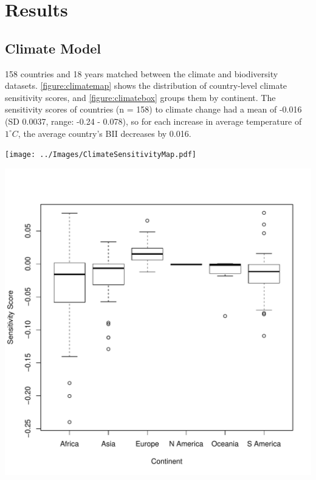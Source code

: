 \documentclass[11pt, a4paper, titlepage]{article}
\begin{document}
	\clearpage

	\section*{Results}
	\subsection*{Climate Model}
	
	158 countries and 18 years matched between the climate and biodiversity datasets. \autoref{figure:climatemap} shows the distribution of country-level climate sensitivity scores, and \autoref{figure:climatebox} groups them by continent. The sensitivity scores of countries (n = 158) to climate change had a mean of -0.016 (SD 0.0037, range: -0.24 - 0.078), so for each increase in average temperature of $1^\circ C$, the average country's BII decreases by 0.016.

	\begin{center}
		\texttt{[image: ../Images/ClimateSensitivityMap.pdf]}
		\label{figure:climatemap}

		\includegraphics[width=7in]{../Images/ClimateSensitivityBoxplot.pdf}
		\label{figure:climatebox}
	\end{center}
	\bigskip
	
\end{document}

